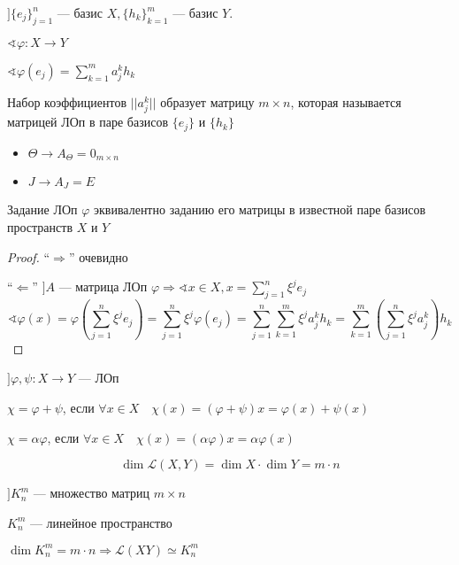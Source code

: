 $] \{e_j\}_{j=1}^n$ --- базис $X, \{h_k\}_{k=1}^m$ --- базис $Y$.

$\sphericalangle \varphi : X\to Y$

$\sphericalangle \varphi(e_j) = \sum\limits_{k=1}^m a_j^k h_k$

\begin{definition}
    Набор коэффициентов $||a_j^k||$ образует матрицу $m\times n$, которая называется матрицей ЛОп в паре базисов $\{e_j\}$ и $\{h_k\}$
\end{definition}

\begin{itemize}
   \item $\Theta \to A_\Theta = 0_{m\times n}$
   \item $J \to A_J = E$
\end{itemize}

\begin{theorem}
    Задание ЛОп $\varphi$ эквивалентно заданию его матрицы в известной паре базисов пространств $X$ и $Y$
\end{theorem}
\begin{proof}
    ``$\Rightarrow$'' очевидно

    ``$\Leftarrow$'' $] A$ --- матрица ЛОп $\varphi \Rightarrow \sphericalangle x\in X, x=\sum\limits_{j=1}^n \xi^j e_j$
    $$\sphericalangle \varphi(x) = \varphi(\sum\limits_{j=1}^n \xi^j e_j) = \sum\limits_{j=1}^n \xi^j \varphi(e_j) = \sum\limits_{j=1}^n \sum\limits_{k=1}^m \xi^j a_j^k h_k = \sum\limits_{k=1}^m \left(\sum\limits_{j=1}^n \xi^j a_j^k\right) h_k$$
\end{proof}

$] \varphi, \psi : X\to Y$ --- ЛОп

$\chi = \varphi + \psi$, если $\forall x\in X \quad \chi(x) = (\varphi + \psi) x = \varphi(x) + \psi(x)$

$\chi = \alpha\varphi$, если $\forall x\in X \quad \chi(x) = (\alpha\varphi) x = \alpha\varphi(x)$

\begin{remark}
    $$\dim \mathcal{L}(X, Y) = \dim X \cdot \dim Y = m\cdot n$$
\end{remark}
\begin{remark}
    $] K_n^m$ --- множество матриц $m\times n$

    $K_n^m$ --- линейное пространство

    $\dim K_n^m=m\cdot n \Rightarrow \mathcal{L}(XY)\simeq K_n^m$
\end{remark}

